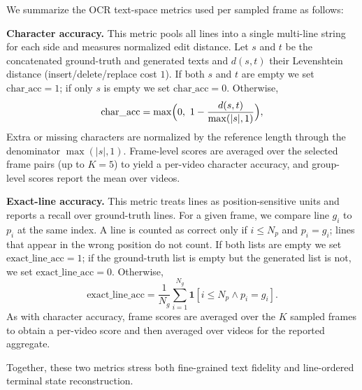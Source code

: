 We summarize the OCR text-space metrics used per sampled frame as follows:
\begin{tcolorbox}[
  colback=metablue!8,
  colframe=metablue!40,
  boxrule=0pt,
  borderline west={1pt}{0pt}{gray!60},
  left=6pt,right=4pt,top=3pt,bottom=3pt]
\small
\textbf{Character accuracy.} This metric pools all lines into a single multi-line string for each side and measures normalized edit distance.
Let $s$ and $t$ be the concatenated ground-truth and generated texts and $d(s,t)$ their Levenshtein distance (insert/delete/replace cost $1$).
If both $s$ and $t$ are empty we set $\text{char\_acc}=1$; if only $s$ is empty we set $\text{char\_acc}=0$.
Otherwise,
\[
  \text{char\_acc} = \max\Bigl(0,\ 1 - \frac{d(s,t)}{\max(|s|,1)}\Bigr),
\]
Extra or missing characters are normalized by the reference length through the denominator $\max(|s|,1)$.
Frame-level scores are averaged over the selected frame pairs (up to $K{=}5$) to yield a per-video character accuracy, and group-level scores report the mean over videos.

\textbf{Exact-line accuracy.} This metric treats lines as position-sensitive units and reports a recall over ground-truth lines.
For a given frame, we compare line $g_i$ to $p_i$ at the same index.
A line is counted as correct only if $i\le N_p$ and $p_i=g_i$; lines that appear in the wrong position do not count.
If both lists are empty we set $\text{exact\_line\_acc}=1$; if the ground-truth list is empty but the generated list is not, we set $\text{exact\_line\_acc}=0$.
Otherwise,
\[
  \text{exact\_line\_acc} = \frac{1}{N_g}\sum_{i=1}^{N_g} \mathbf{1}[i \le N_p \land p_i = g_i].
\]
As with character accuracy, frame scores are averaged over the $K$ sampled frames to obtain a per-video score and then averaged over videos for the reported aggregate.
\end{tcolorbox} 
Together, these two metrics stress both fine-grained text fidelity and line-ordered terminal state reconstruction.

